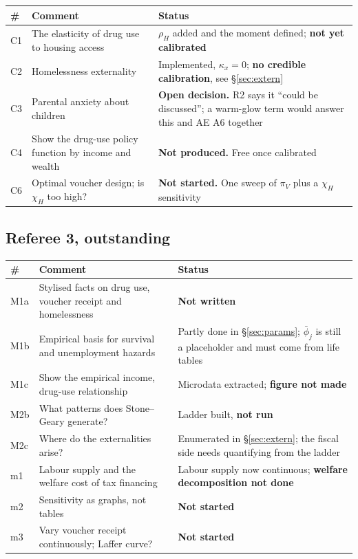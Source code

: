\documentclass[11pt]{article}
\begin{document}
\begin{longtable}{lL{7.4cm}L{4.6cm}}
\toprule
\# & Comment & Status\\
\midrule
\endhead
C1 & The elasticity of drug use to housing access & $\rho_H$ added and the moment defined; \textbf{not yet calibrated}\\
C2 & Homelessness externality & Implemented, $\kappa_x=0$; \textbf{no credible calibration}, see \S\ref{sec:extern}\\
C3 & Parental anxiety about children & \textbf{Open decision.} R2 says it ``could be discussed''; a warm-glow term would answer this and AE A6 together\\
C4 & Show the drug-use policy function by income and wealth & \textbf{Not produced.} Free once calibrated\\
C6 & Optimal voucher design; is $\chi_H$ too high? & \textbf{Not started.} One sweep of $\pi_V$ plus a $\chi_H$ sensitivity\\
\bottomrule
\end{longtable}

\subsection{Referee 3, outstanding}

\begin{longtable}{lL{7.4cm}L{4.6cm}}
\toprule
\# & Comment & Status\\
\midrule
\endhead
M1a & Stylised facts on drug use, voucher receipt and homelessness & \textbf{Not written}\\
M1b & Empirical basis for survival and unemployment hazards & Partly done in \S\ref{sec:params}; $\bar\phi_j$ is still a placeholder and must come from life tables\\
M1c & Show the empirical income, drug-use relationship & Microdata extracted; \textbf{figure not made}\\
M2b & What patterns does Stone--Geary generate? & Ladder built, \textbf{not run}\\
M2c & Where do the externalities arise? & Enumerated in \S\ref{sec:extern}; the fiscal side needs quantifying from the ladder\\
m1 & Labour supply and the welfare cost of tax financing & Labour supply now continuous; \textbf{welfare decomposition not done}\\
m2 & Sensitivity as graphs, not tables & \textbf{Not started}\\
m3 & Vary voucher receipt continuously; Laffer curve? & \textbf{Not started}\\
\bottomrule
\end{longtable}
\end{document}
